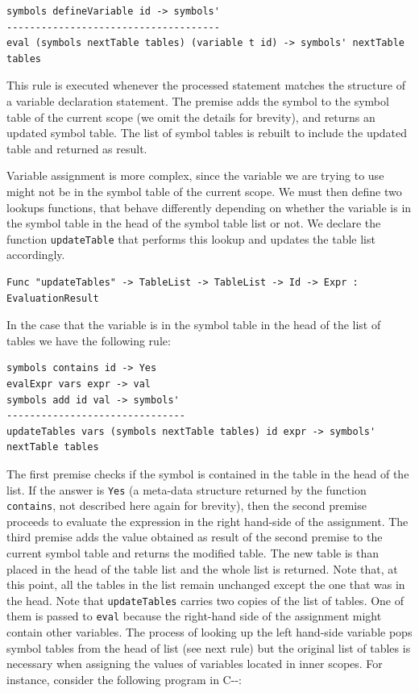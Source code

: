 \begin{lstlisting}
symbols defineVariable id -> symbols'
-------------------------------------
eval (symbols nextTable tables) (variable t id) -> symbols' nextTable tables
\end{lstlisting}

\noindent
This rule is executed whenever the processed statement matches the structure of a variable declaration statement. The premise adds the symbol to the symbol table of the current scope (we omit the details for brevity), and returns an updated symbol table. The list of symbol 
tables is rebuilt to include the updated table and returned as result.

Variable assignment is more complex, since the variable we are trying to use might not be in the symbol table of the current scope. We must then define two lookups functions, that behave differently depending on whether the variable is in the symbol table in the head of the symbol table list or not. We declare the function \texttt{updateTable} that performs this lookup and updates the table list accordingly. 

\begin{lstlisting}
Func "updateTables" -> TableList -> TableList -> Id -> Expr : EvaluationResult
\end{lstlisting}

\noindent
In the case that the variable is in the symbol table in the head of the list of tables we have the following rule:

\begin{lstlisting}
symbols contains id -> Yes
evalExpr vars expr -> val
symbols add id val -> symbols'
-------------------------------
updateTables vars (symbols nextTable tables) id expr -> symbols' nextTable tables
\end{lstlisting}

\noindent
The first premise checks if the symbol is contained in the table in the head of the list. If the answer is \texttt{Yes} (a meta-data structure returned by the function \texttt{contains}, not described here again for brevity), then the second premise proceeds to evaluate the expression in the right hand-side of the assignment. The third premise adds the value obtained as result of the second premise to the current symbol table and returns the modified table. The new table is than placed in the head of the table list and the whole list is returned. Note that, at this point, all the tables in the list remain unchanged except the one that was in the head. Note that \texttt{updateTables} carries two copies of the list of tables. One of them is passed to \texttt{eval} because the right-hand side of the assignment might contain other variables. The process of looking up the left hand-side variable pops symbol tables from the head of list (see next rule) but the original list of tables is necessary when assigning the values of variables located in inner scopes. For instance, consider the following program in C-{}-:

